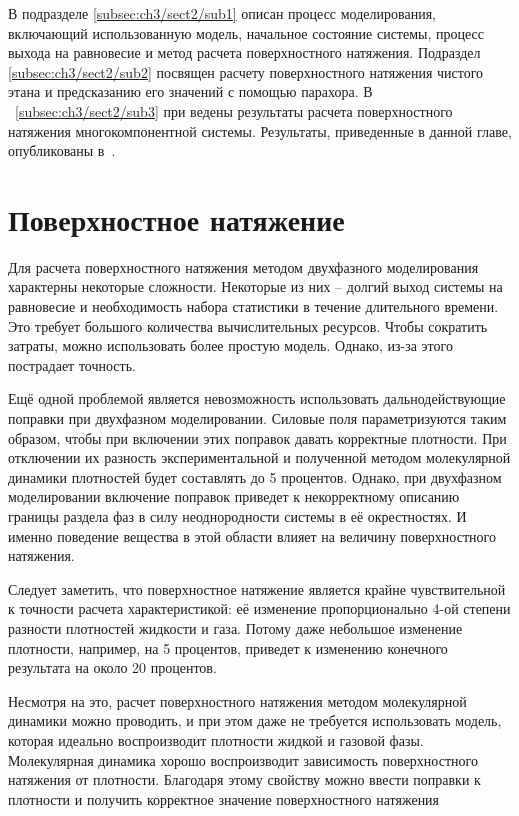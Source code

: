 В подразделе \cref{subsec:ch3/sect2/sub1} описан процесс моделирования, включающий использованную модель, начальное состояние системы, процесс выхода на равновесие и метод расчета поверхностного натяжения. Подраздел \cref{subsec:ch3/sect2/sub2} посвящен расчету поверхностного натяжения чистого этана и предсказанию его значений с помощью парахора. В ~\cref{subsec:ch3/sect2/sub3} при ведены результаты расчета поверхностного натяжения многокомпонентной системы. Результаты, приведенные в данной главе, опубликованы в~\cite{RJOPC285654}.

\section{Поверхностное натяжение}

Для расчета поверхностного натяжения методом двухфазного моделирования характерны некоторые сложности. Некоторые из них \--- долгий выход системы на равновесие и необходимость набора статистики в течение длительного времени. Это требует большого количества вычислительных ресурсов. Чтобы сократить затраты, можно использовать более простую модель. Однако, из-за этого пострадает точность. 

Ещё одной проблемой является невозможность использовать дальнодействующие поправки при двухфазном моделировании. Силовые поля параметризуются таким образом, чтобы при включении этих поправок давать корректные плотности. При отключении их разность экспериментальной и полученной методом молекулярной динамики плотностей будет составлять до 5 процентов. Однако, при двухфазном моделировании включение поправок приведет к некорректному описанию границы раздела фаз в силу неоднородности системы в её окрестностях. И именно поведение вещества в этой области влияет на величину поверхностного натяжения.

Следует заметить, что поверхностное натяжение является крайне чувствительной к точности расчета характеристикой: её изменение пропорционально 4-ой степени разности плотностей жидкости и газа. Потому даже небольшое изменение плотности, например, на 5 процентов, приведет к изменению конечного результата на около 20 процентов. 

Несмотря на это, расчет поверхностного натяжения методом молекулярной динамики можно проводить, и при этом даже не требуется использовать модель, которая идеально воспроизводит плотности жидкой и газовой фазы. Молекулярная динамика хорошо воспроизводит зависимость поверхностного натяжения от плотности. Благодаря этому свойству можно ввести поправки к плотности и получить корректное значение поверхностного натяжения


